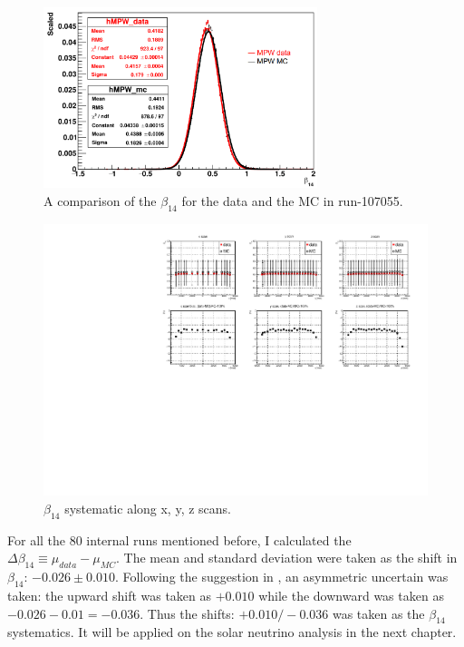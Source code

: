 \begin{figure}[htbp]
	\centering
	\includegraphics[width=8cm]{N16FitMPW_beta14_107055.png}
	\caption{A comparison of the $\beta_{14}$ for the data and the MC in run-107055.}
	\label{N16beta14MPW}
\end{figure}

\begin{figure}[htbp]
	\centering
	\includegraphics[width=15cm]{beta14_xyzScans.pdf}
	\caption{$\beta_{14}$ systematic along x, y, z scans.}
	\label{beta14_XYZscans}
\end{figure}

For all the 80 internal runs mentioned before, I calculated the $\Delta \beta_{14}\equiv\mu_{data}-\mu_{MC}$. The mean and standard deviation were taken as the shift in $\beta_{14}$: $-0.026\pm0.010$. Following the suggestion in \cite{waterunidoc}, an asymmetric uncertain was taken: the upward shift was taken as $+0.010$ while the downward was taken as $-0.026-0.01=-0.036$. Thus the shifts: $+0.010/-0.036$ was taken as the $\beta_{14}$ systematics. It will be applied on the solar neutrino analysis in the next chapter. 

